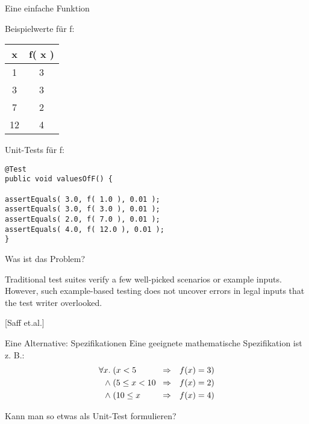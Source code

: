 \begin{frame}[fragile]{Eine einfache Funktion}

\begin{minipage}[t]{5cm}
Beispielwerte für f:

\begin{tabular}{|c|c|}
\textbf{x} & \textbf{f( x )}  \\ \hline
1 & 3  \\
3 & 3  \\
7 & 2  \\
12 & 4
\end{tabular} 
\end{minipage}
\begin{minipage}[t]{5cm}
Unit-Tests für  f:

\begin{lstlisting}
@Test
public void valuesOfF() {

assertEquals( 3.0, f( 1.0 ), 0.01 );
assertEquals( 3.0, f( 3.0 ), 0.01 );
assertEquals( 2.0, f( 7.0 ), 0.01 );
assertEquals( 4.0, f( 12.0 ), 0.01 );
}
\end{lstlisting}
\end{minipage}
\end{frame}

\begin{frame}{Was ist das Problem?}

\glqq{}Traditional test suites verify a few well-picked scenarios or example inputs. However, such example-based testing does not uncover errors in legal inputs that the test writer overlooked.\grqq{}

\hfill[Saff et.al.]

\end{frame}

\begin{frame}{Eine Alternative: Spezifikationen}
Eine geeignete mathematische Spezifikation ist z. B.:
\begin{eqnarray*}
\forall x. \; \parbox{2cm}{$(x < 5$} &\Rightarrow& f(x) = 3) \\
\land \; \parbox{2cm}{$(5 \leq x < 10$} &\Rightarrow& f(x) = 2)\\
\land \; \parbox{2cm}{$(10 \leq x$} &\Rightarrow& f(x) = 4)
\end{eqnarray*}

Kann man so etwas als Unit-Test formulieren?
\end{frame}

